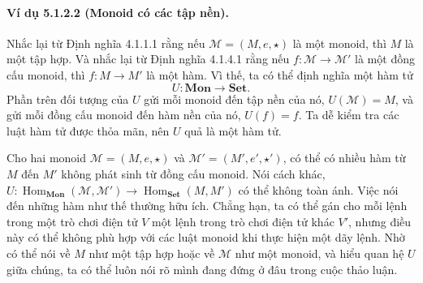 \paragraph{Ví dụ 5.1.2.2 (Monoid có các tập nền).} Nhắc lại từ Định nghĩa 4.1.1.1 rằng nếu $\mathcal M=(M,e,\star)$ là một monoid, thì $M$ là một tập hợp. Và nhắc lại từ Định nghĩa 4.1.4.1 rằng nếu $f:\mathcal M\to\mathcal M'$ là một đồng cấu monoid, thì $f:M\to M'$ là một hàm. Vì thế, ta có thể định nghĩa một hàm tử
\[U:\mathbf{Mon}\longrightarrow\mathbf{Set}.\]
Phần trên đối tượng của $U$ gửi mỗi monoid đến tập nền của nó, $U(\mathcal M)=M$, và gửi mỗi đồng cấu monoid đến hàm nền của nó, $U(f)=f$. Ta dễ kiểm tra các luật hàm tử được thỏa mãn, nên $U$ quả là một hàm tử.

Cho hai monoid $\mathcal M=(M,e,\star)$ và $\mathcal M'=(M',e',\star')$, có thể có nhiều hàm từ $M$ đến $M'$ không phát sinh từ đồng cấu monoid. Nói cách khác, $U:\operatorname{Hom}_{\mathbf{Mon}}(\mathcal M,\mathcal M')\to\operatorname{Hom}_{\mathbf{Set}}(M,M')$ có thể không toàn ánh. Việc nói đến những hàm như thế thường hữu ích. Chẳng hạn, ta có thể gán cho mỗi lệnh trong một trò chơi điện tử $V$ một lệnh trong trò chơi điện tử khác $V'$, nhưng điều này có thể không phù hợp với các luật monoid khi thực hiện một dãy lệnh. Nhờ có thể nói về $M$ như một tập hợp hoặc về $\mathcal M$ như một monoid, và hiểu quan hệ $U$ giữa chúng, ta có thể luôn nói rõ mình đang đứng ở đâu trong cuộc thảo luận.

